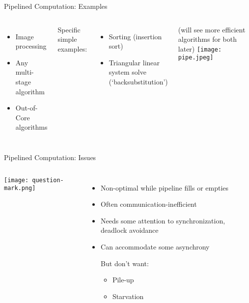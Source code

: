 \documentclass[english,compress]{beamer}
\begin{document}
\begin{frame}{Pipelined Computation: Examples}
  \begin{columns}
      \begin{itemize}
        \item Image processing
        \item Any multi-stage algorithm
        \item Out-of-Core algorithms
      \end{itemize}

      \bigskip
      Specific simple examples:
      \begin{itemize}
        \item Sorting (insertion sort)
        \item Triangular linear system solve \\ (`backsubstitution')
      \end{itemize}
      (will see more efficient algorithms for both later)
      \texttt{[image: pipe.jpeg]}
  \end{columns}
\end{frame}
\begin{frame}{Pipelined Computation: Issues}
  \begin{columns}
      \texttt{[image: question-mark.png]}
      \begin{itemize}
        \item Non-optimal while pipeline fills or empties
        \item Often communication-inefficient
        \item Needs some attention to synchronization,
          deadlock avoidance
        \item Can accommodate some asynchrony

          But don't want:
          \begin{itemize}
            \item Pile-up
            \item Starvation
          \end{itemize}
      \end{itemize}
  \end{columns}
\end{frame}
\end{document}
